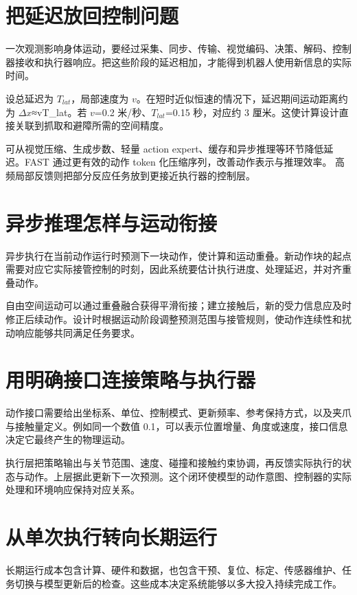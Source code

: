 \documentclass[UTF8,a4paper,11pt,oneside,openany,fontset=none]{ctexbook}
\begin{document}
\section{把延迟放回控制问题}

一次观测影响身体运动，要经过采集、同步、传输、视觉编码、决策、解码、控制器接收和执行器响应。把这些阶段的延迟相加，才能得到机器人使用新信息的实际时间。

设总延迟为 \(T_{lat}\)，局部速度为 \(v\)。在短时近似恒速的情况下，延迟期间运动距离约为 \(\Delta\)\(x\)≈vT\_lat。若 \(v\)=0.2 米/秒、\(T_{lat}\)=0.15 秒，对应约 3 厘米。这使计算设计直接关联到抓取和避障所需的空间精度。

可从视觉压缩、生成步数、轻量 action expert、缓存和异步推理等环节降低延迟。FAST 通过更有效的动作 token 化压缩序列，改善动作表示与推理效率。\cite{R42} 高频局部反馈则把部分反应任务放到更接近执行器的控制层。

\section{异步推理怎样与运动衔接}

异步执行在当前动作运行时预测下一块动作，使计算和运动重叠。新动作块的起点需要对应它实际接管控制的时刻，因此系统要估计执行进度、处理延迟，并对齐重叠动作。

自由空间运动可以通过重叠融合获得平滑衔接；建立接触后，新的受力信息应及时修正后续动作。设计时根据运动阶段调整预测范围与接管规则，使动作连续性和扰动响应能够共同满足任务要求。

\section{用明确接口连接策略与执行器}

动作接口需要给出坐标系、单位、控制模式、更新频率、参考保持方式，以及夹爪与接触量定义。例如同一个数值 0.1，可以表示位置增量、角度或速度，接口信息决定它最终产生的物理运动。

执行层把策略输出与关节范围、速度、碰撞和接触约束协调，再反馈实际执行的状态与动作。上层据此更新下一次预测。这个闭环使模型的动作意图、控制器的实际处理和环境响应保持对应关系。

\section{从单次执行转向长期运行}

长期运行成本包含计算、硬件和数据，也包含干预、复位、标定、传感器维护、任务切换与模型更新后的检查。这些成本决定系统能够以多大投入持续完成工作。
\end{document}
